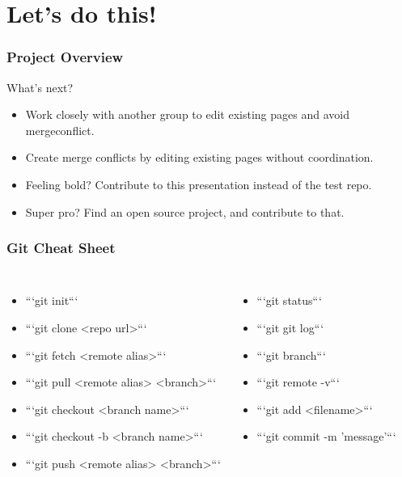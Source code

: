 \documentclass[unknownkeysallowed]{beamer}
\begin{document}
\section{Let's do this!}
\begin{frame}
    \frametitle{Project Overview}
    What's next?
    \begin{itemize}
        \item{Work closely with another group to edit existing pages and avoid mergeconflict.}
        \item{Create merge conflicts by editing existing pages without coordination.}
        \item{Feeling bold? Contribute to this presentation instead of the test repo.}
        \item{Super pro? Find an open source project, and contribute to that.}
    \end{itemize}
\end{frame}

\begin{frame}
\frametitle{Git Cheat Sheet}
\begin{columns}
    \column{2.75in}
        \begin{itemize}
            \item{```git init```}
            \item{```git clone <repo url>```}
            \item{```git fetch <remote alias>```}
            \item{```git pull <remote alias> <branch>```}
            \item{```git checkout <branch name>```}
            \item{```git checkout -b <branch name>```}
            \item{```git push <remote alias> <branch>```}

        \end{itemize}
    \column{2.0in}
        \begin{itemize}
            \item{```git status```}
            \item{```git git log```}
            \item{```git branch```}
            \item{```git remote -v```}
            \item{```git add <filename>```}
            \item{```git commit -m 'message'```}
        \end{itemize}
    \end{columns}
\end{frame}
\end{document}
